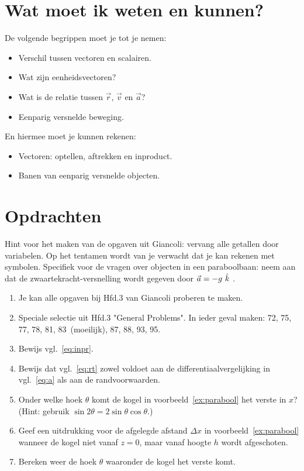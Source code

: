 \section{Wat moet ik weten en kunnen?}

De volgende begrippen moet je tot je nemen:
\begin{itemize}
\item Verschil tussen vectoren en scalairen.
\item Wat zijn eenheidsvectoren?
\item Wat is de relatie tussen $\vec{r}$, $\vec{v}$ en $\vec{a}$?
\item Eenparig versnelde beweging.
\end{itemize}
En hiermee moet je kunnen rekenen:
\begin{itemize}
\item Vectoren: optellen, aftrekken en inproduct.
\item Banen van eenparig versnelde objecten.
\end{itemize}

\section{Opdrachten}

Hint voor het maken van de opgaven uit Giancoli: vervang alle getallen door variabelen. Op het 
tentamen wordt van je verwacht dat je kan rekenen met symbolen. Specifiek voor de vragen over 
objecten in een paraboolbaan: neem aan dat de zwaartekracht-versnelling wordt gegeven door $
\vec{a} = -g~\hat{k}~$.
\begin{enumerate}
\item Je kan alle opgaven bij Hfd.3 van Giancoli proberen te maken.
\item Speciale selectie uit Hfd.3 "General Problems". In ieder geval maken: 72, 75, 77, 78, 81, 83~(moeilijk),  87, 88, 93, 95.   
\item Bewijs vgl.~\ref{eq:inpr}.
\item Bewijs dat vgl.~\ref{eq:rt} zowel voldoet aan de differentiaalvergelijking in vgl.~\ref{eq:a} als 
aan de randvoorwaarden.
\item Onder welke hoek $\theta$ komt de kogel in voorbeeld~\ref{ex:parabool} het verste in $x$? 
(Hint: gebruik $\sin 2\theta = 2\sin\theta\cos\theta$.)
\item Geef een uitdrukking voor de afgelegde afstand $\Delta x$ in voorbeeld~\ref{ex:parabool} 
wanneer de kogel niet vanaf $z=0$, maar vanaf hoogte $h$ wordt afgeschoten.
\item Bereken weer de hoek $\theta$ waaronder de kogel het verste komt.
\end{enumerate}

